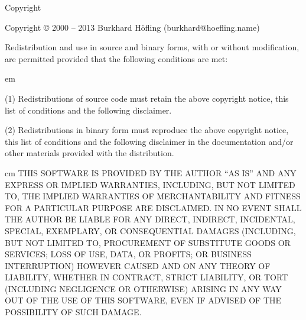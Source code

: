 \Chapter Copyright


Copyright © 2000 – 2013 Burkhard Höfling (burkhard@hoefling.name)

Redistribution and use in source and binary forms, with or without
modification, are permitted provided that the following conditions are
met:
\medskip

{ em
\item{(1)} Redistributions of source code must retain the above copyright
    notice, this list of conditions and the following disclaimer. 

\item{(2)} Redistributions in binary form must reproduce the above copyright
    notice, this list of conditions and the following disclaimer in
    the documentation and/or other materials provided with the
    distribution. \par}
\medskip
    
{ cm 
THIS SOFTWARE IS PROVIDED BY THE AUTHOR ``AS IS'' AND ANY EXPRESS OR
IMPLIED WARRANTIES, INCLUDING, BUT NOT LIMITED TO, THE IMPLIED
WARRANTIES OF MERCHANTABILITY AND FITNESS FOR A PARTICULAR PURPOSE ARE
DISCLAIMED. IN NO EVENT SHALL THE AUTHOR BE LIABLE FOR ANY DIRECT,
INDIRECT, INCIDENTAL, SPECIAL, EXEMPLARY, OR CONSEQUENTIAL DAMAGES
(INCLUDING, BUT NOT LIMITED TO, PROCUREMENT OF SUBSTITUTE GOODS OR
SERVICES; LOSS OF USE, DATA, OR PROFITS; OR BUSINESS INTERRUPTION)
HOWEVER CAUSED AND ON ANY THEORY OF LIABILITY, WHETHER IN CONTRACT,
STRICT LIABILITY, OR TORT (INCLUDING NEGLIGENCE OR OTHERWISE) ARISING
IN ANY WAY OUT OF THE USE OF THIS SOFTWARE, EVEN IF ADVISED OF THE
POSSIBILITY OF SUCH DAMAGE.\par}

